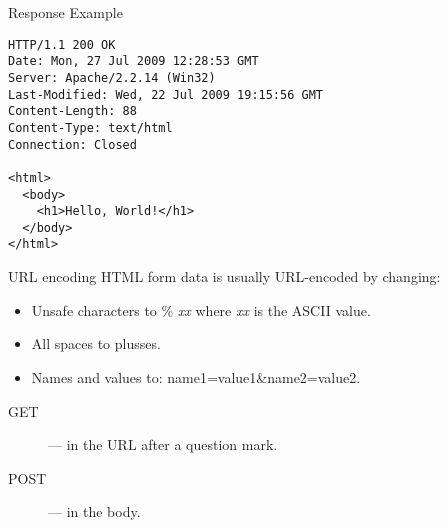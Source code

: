 \begin{frame}[fragile]{Response Example}
  \begin{verbatim}
HTTP/1.1 200 OK
Date: Mon, 27 Jul 2009 12:28:53 GMT
Server: Apache/2.2.14 (Win32)
Last-Modified: Wed, 22 Jul 2009 19:15:56 GMT
Content-Length: 88
Content-Type: text/html
Connection: Closed

<html>
  <body>
    <h1>Hello, World!</h1>
  </body>
</html>
  \end{verbatim}
\end{frame}


\begin{frame}{URL encoding}
  HTML form data is usually URL-encoded by changing:
  \begin{itemize}
    \item Unsafe characters to \% \emph{xx} where \emph{xx} is the ASCII value.
    \item All spaces to plusses.
    \item Names and values to: name1=value1\&name2=value2.
  \end{itemize}
  \hr
  \begin{description}
    \item[GET] --- in the URL after a question mark.
    \item[POST] --- in the body.
  \end{description}
\end{frame}

